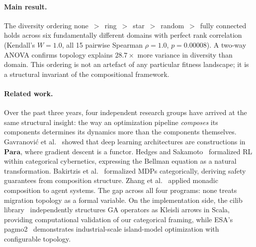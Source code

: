 \documentclass[submission,copyright,creativecommons]{eptcs}
\begin{document}
\paragraph{Main result.}
The diversity ordering
none~$>$~ring~$>$~star~$>$~random~$>$~fully connected holds across
six fundamentally different domains with perfect rank correlation
(Kendall's $W = 1.0$, all 15 pairwise Spearman $\rho = 1.0$,
$p = 0.00008$). A two-way ANOVA confirms topology explains
$28.7\times$ more variance in diversity than domain. This ordering is
not an artefact of any particular fitness landscape; it is a
structural invariant of the compositional framework.

\paragraph{Related work.}
Over the past three years, four independent research groups have
arrived at the same structural insight: the way an optimization
pipeline \emph{composes} its components determines its dynamics more
than the components themselves. Gavranovi\'{c} et
al.~\cite{gavranovic2024categorical} showed that deep learning
architectures are constructions in $\mathbf{Para}$, where gradient
descent is a functor. Hedges and
Sakamoto~\cite{hedges2024reinforcement} formalized RL within
categorical cybernetics, expressing the Bellman equation as a natural
transformation. Bakirtzis et al.~\cite{bakirtzis2024compositional}
formalized MDPs categorically, deriving safety guarantees from
composition structure. Zhang et al.~\cite{zhang2024mce} applied
monadic composition to agent systems. The gap across all four
programs: none treats migration topology as a formal variable.
On the implementation side, the cilib library~\cite{cilib}
independently structures GA operators as Kleisli arrows in Scala,
providing computational validation of our categorical framing, while
ESA's pagmo2~\cite{pagmo2} demonstrates industrial-scale island-model
optimization with configurable topology.
\end{document}
